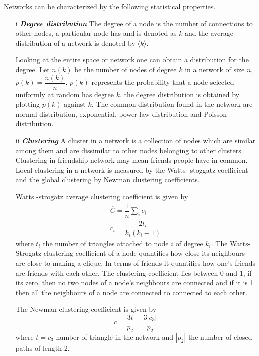 Networks can be characterized by the following statistical properties.
 \begin{itemize}
  \item[i] \textit{\textbf{Degree distribution}}
 The degree of a node is the number of connections to other nodes, a particular node has and is denoted as $k$ and the average distribution of a network is denoted by $\langle k \rangle$.

Looking at the entire space or network one can obtain a distribution for the degree. Let $n (k) $ be the number of nodes of degree $k$ in a network of size $n$, $p (k) = \dfrac{n(k)}{n}$. $p (k) $ represents the probability that a node selected uniformly at random has degree $k$. the degree distribution is obtained by plotting $p (k) $ against $k$\citep{estrada2015first}. The common distribution found in the network are normal distribution, exponential, power law distribution and Poisson distribution\citep{chung2002average}.

 \item[ii] \textit{\textbf{Clustering }}
 A cluster in a network  is a collection of nodes which are similar among them and are dissimilar to other nodes belonging to other clusters. Clustering in friendship network may mean friends people have in common. Local clustering in a network is measured by   the Watts -stoggatz  coefficient and the global clustering by  Newman clustering coefficients.
 
 Watts -strogatz average clustering coefficient is given by 
 \begin{align}
 \overline{C} = \dfrac{1}{n} \sum_i c_i
  \\ c_i = \dfrac{2t_i}{k_i(k_i-1)} \nonumber
  \end{align}
   where $t_i $ the number of triangles attached to node $i$ of degree $k_i$. The Watts-Strogatz clustering coefficient of a node quantifies how close its neighbours are close to making a clique. In terms of friends it quantifies how one's friends are friends with each other. The clustering coefficient lies between 0 and 1, if its zero, then no two nodes of a node's neighbours are connected and if it is 1 then all the neighbours of a node are connected to connected to each other.
  

 The Newman clustering coefficient is given by
 \begin{equation}
 c = \frac{3t}{p_2} =\dfrac{3|c_3|}{p_2}
 \end{equation}
 where $t = c_3$ number of triangle in the network and $|p_2|$ the number of closed paths of length 2. 
\end{itemize}

